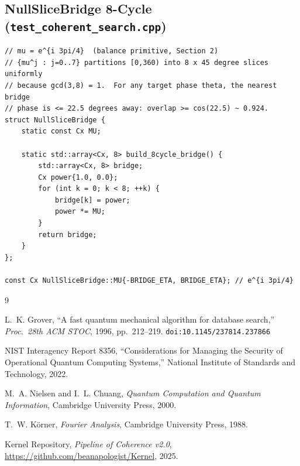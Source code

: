 \documentclass[12pt,a4paper]{article}
\theoremstyle{plain}
\theoremstyle{definition}
\theoremstyle{remark}
\begin{document}
\subsection{NullSliceBridge 8-Cycle (\texttt{test\_coherent\_search.cpp})}
\label{app:bridge}

\begin{lstlisting}[caption={NullSliceBridge: uniform 45-degree phase partition.},
                   label={lst:bridge}]
// mu = e^{i 3pi/4}  (balance primitive, Section 2)
// {mu^j : j=0..7} partitions [0,360) into 8 x 45 degree slices uniformly
// because gcd(3,8) = 1.  For any target phase theta, the nearest bridge
// phase is <= 22.5 degrees away: overlap >= cos(22.5) ~ 0.924.
struct NullSliceBridge {
    static const Cx MU;

    static std::array<Cx, 8> build_8cycle_bridge() {
        std::array<Cx, 8> bridge;
        Cx power{1.0, 0.0};
        for (int k = 0; k < 8; ++k) {
            bridge[k] = power;
            power *= MU;
        }
        return bridge;
    }
};

const Cx NullSliceBridge::MU{-BRIDGE_ETA, BRIDGE_ETA}; // e^{i 3pi/4}
\end{lstlisting}

\begin{thebibliography}{9}

L.~K. Grover,
``A fast quantum mechanical algorithm for database search,''
\emph{Proc.\ 28th ACM STOC}, 1996, pp.~212--219.
\texttt{doi:10.1145/237814.237866}

NIST Interagency Report 8356,
``Considerations for Managing the Security of Operational Quantum Computing
Systems,''
National Institute of Standards and Technology, 2022.

M.~A. Nielsen and I.~L. Chuang,
\emph{Quantum Computation and Quantum Information},
Cambridge University Press, 2000.

T.~W. K\"{o}rner,
\emph{Fourier Analysis},
Cambridge University Press, 1988.

Kernel Repository,
\emph{Pipeline of Coherence v2.0},
\url{https://github.com/beanapologist/Kernel}, 2025.

\end{thebibliography}
\end{document}
